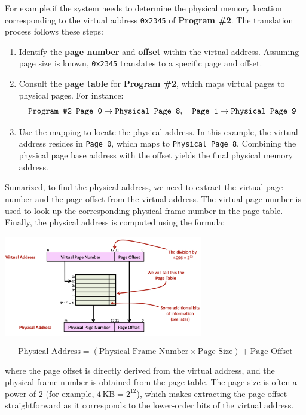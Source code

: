 For example,if the system needs to determine the physical memory location corresponding to the virtual address \texttt{0x2345} of \textbf{Program \#2}. The translation process follows these steps:

\begin{enumerate}
    \item Identify the \textbf{page number} and \textbf{offset} within the virtual address. Assuming page size is known, \texttt{0x2345} translates to a specific page and offset.
    \item Consult the \textbf{page table} for \textbf{Program \#2}, which maps virtual pages to physical pages. For instance:
    \[
    \text{\texttt{Program \#2 Page 0}} \rightarrow \text{\texttt{Physical Page 8}}, \quad
    \text{\texttt{Page 1}} \rightarrow \text{\texttt{Physical Page 9}}
    \]
    \item Use the mapping to locate the physical address. In this example, the virtual address resides in \texttt{Page 0}, which maps to \texttt{Physical Page 8}. Combining the physical page base address with the offset yields the final physical memory address.
\end{enumerate}

Sumarized, to find the physical address, we need to extract the virtual page number and the page offset from the virtual address. The virtual page number is used to look up the corresponding physical frame number in the page table. Finally, the physical address is computed using the formula:
\begin{center}
    \includegraphics[width=0.65\textwidth]{chapters/chapter3c/images/translate2.png}
\end{center}
\[
\text{Physical Address} = (\text{Physical Frame Number} \times \text{Page Size}) + \text{Page Offset}
\]

where the page offset is directly derived from the virtual address, and the physical frame number is obtained from the page table. The page size is often a power of 2 (for example, \(4 \, \text{KB} = 2^{12}\)), which makes extracting the page offset straightforward as it corresponds to the lower-order bits of the virtual address.
\newpage
